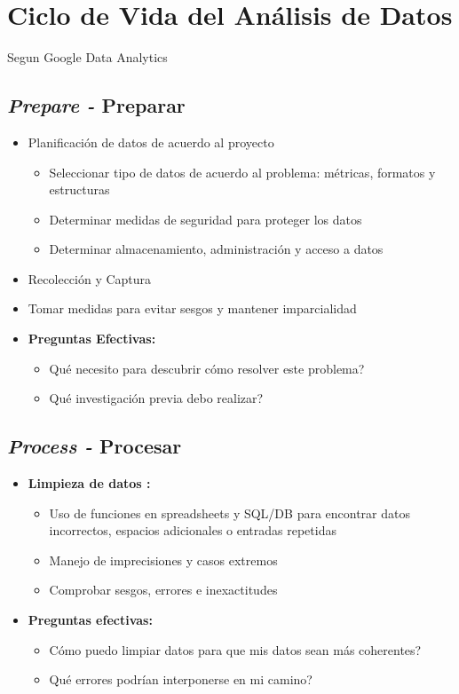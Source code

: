 \section{Ciclo de Vida del Análisis de Datos}
Segun Google Data Analytics



\subsection{\textit{Prepare - }Preparar}
\begin{itemize}
    \item {Planificación de datos de acuerdo al proyecto
    \begin{itemize}
        \item {Seleccionar tipo de datos de acuerdo al problema: métricas, formatos y estructuras}
        \item {Determinar medidas de seguridad para proteger los datos}
        \item {Determinar almacenamiento, administración y acceso a datos}
    \end{itemize}}
    \item {Recolección y Captura}
    \item {Tomar medidas para evitar sesgos y mantener imparcialidad}
    \item {\textbf{Preguntas Efectivas:}
    \begin{itemize}
        \item {Qué necesito para descubrir cómo resolver este problema?}
        \item {Qué investigación previa debo realizar?}
    \end{itemize}}
\end{itemize}

\subsection{\textit{Process - }Procesar}
\begin{itemize}
    \item {\textbf{Limpieza de datos : }
    \begin{itemize}
        \item {Uso de funciones en spreadsheets y SQL/DB para encontrar datos incorrectos, espacios adicionales o entradas repetidas}
        \item {Manejo de imprecisiones y casos extremos}
        \item {Comprobar sesgos, errores e inexactitudes}
    \end{itemize}}
    \item {\textbf{Preguntas efectivas:}
    \begin{itemize}
        \item {Cómo puedo limpiar datos para que mis datos sean más coherentes?}
        \item {Qué errores podrían interponerse en mi camino?}
    \end{itemize}}
\end{itemize}

